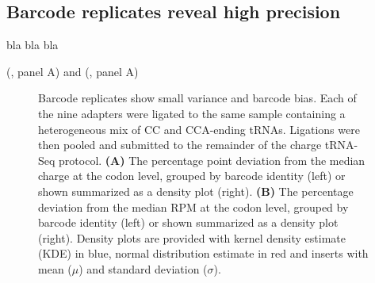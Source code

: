 \documentclass[9pt,lineno]{elife}
\begin{document}
\subsection{Barcode replicates reveal high precision}

bla bla bla

(, panel A)
and
(, panel A)



\lipsum[5]




\begin{figure}[ht!]
\centering
{}
\caption{
Barcode replicates show small variance and barcode bias.
Each of the nine adapters were ligated to the same sample containing a heterogeneous mix of CC and CCA-ending tRNAs.
Ligations were then pooled and submitted to the remainder of the charge tRNA-Seq protocol.
\textbf{(A)} The percentage point deviation from the median charge at the codon level, grouped by barcode identity (left) or shown summarized as a density plot (right).
\textbf{(B)} The percentage deviation from the median RPM at the codon level, grouped by barcode identity (left) or shown summarized as a density plot (right).
Density plots are provided with kernel density estimate (KDE) in blue, normal distribution estimate in red and inserts with mean ($\mu$) and standard deviation ($\sigma$).
}
\label{fig:Fig4}

\label{figsupp:f4S1}


\end{figure}
\end{document}
